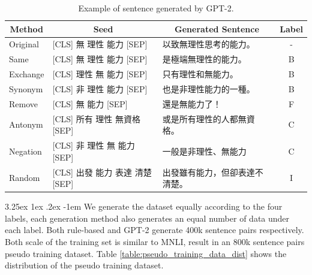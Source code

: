 \documentclass[12pt]{article}
\makeatletter
\renewcommand\paragraph{\@startsection{paragraph}{5}{\z@}%
  {3.25ex \@plus1ex \@minus.2ex}%
  {-1em}%
  {\normalfont\normalsize\bfseries}}
\makeatother
\begin{document}
\begin{CJK*}{UTF8}{bkai}
\begin{spacing}{1.77}
\begin{table}[H]
  \centering
  \setlength{\extrarowheight}{-3pt}
  \begin{tabular}{|l|l|l|c|}
  \hline
  \multicolumn{1}{|c|}{Method} & \multicolumn{1}{c|}{Seed} & \multicolumn{1}{c|}{Generated Sentence} & Label \\ \hline
  Original & {[}CLS{]} 無 理性 能力 {[}SEP{]} & 以致無理性思考的能力。 & - \\ \hline
  Same & {[}CLS{]} 無 理性 能力 {[}SEP{]} & 是極端無理性的能力。 & B \\ \hline
  Exchange & {[}CLS{]} 理性 無 能力 {[}SEP{]} & 只有理性和無能力。 & B \\ \hline
  Synonym & {[}CLS{]} 非 理性 能力 {[}SEP{]} & 也是非理性能力的一種。 & B \\ \hline
  Remove & {[}CLS{]} 無 能力 {[}SEP{]} & 還是無能力了！ & F \\ \hline
  Antonym & {[}CLS{]} 所有 理性 無資格 {[}SEP{]} & 或是所有理性的人都無資格。 & C \\ \hline
  Negation & {[}CLS{]} 非 理性 無 能力 {[}SEP{]} & 一般是非理性、無能力 & C \\ \hline
  Random & {[}CLS{]} 出發 能力 表達 清楚 {[}SEP{]} & 出發雖有能力，但卻表達不清楚。 & I \\ \hline
  \end{tabular}
  \caption{Example of sentence generated by GPT-2.}
  \label{example:GPT-2_pseudo}
\end{table}

\paragraph{}
We generate the dataset equally according to the four labels, each generation method also generates an equal number of data under each label. Both rule-based and GPT-2 generate 400k sentence pairs respectively. Both scale of the training set is similar to MNLI, result in an 800k sentence pairs pseudo training dataset. Table \ref{table:pseudo_training_data_dist} shows the distribution of the pseudo training dataset.


\end{spacing}
\end{CJK*}
\end{document}
